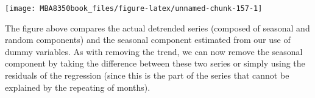 \documentclass[
]{book}
\newenvironment{Shaded}{\begin{snugshade}}{\end{snugshade}}
\newcommand{\AttributeTok}[1]{\textcolor[rgb]{0.77,0.63,0.00}{#1}}
\newcommand{\ConstantTok}[1]{\textcolor[rgb]{0.00,0.00,0.00}{#1}}
\newcommand{\DecValTok}[1]{\textcolor[rgb]{0.00,0.00,0.81}{#1}}
\newcommand{\FunctionTok}[1]{\textcolor[rgb]{0.00,0.00,0.00}{#1}}
\newcommand{\NormalTok}[1]{#1}
\newcommand{\OtherTok}[1]{\textcolor[rgb]{0.56,0.35,0.01}{#1}}
\newcommand{\SpecialCharTok}[1]{\textcolor[rgb]{0.00,0.00,0.00}{#1}}
\newcommand{\StringTok}[1]{\textcolor[rgb]{0.31,0.60,0.02}{#1}}
\begin{document}
\begin{Shaded}
\end{Shaded}

\begin{center}\texttt{[image: MBA8350book\_files/figure-latex/unnamed-chunk-157-1]} \end{center}

The figure above compares the actual detrended series (composed of seasonal and random components) and the seasonal component estimated from our use of dummy variables. As with removing the trend, we can now remove the seasonal component by taking the difference between these two series or simply using the residuals of the regression (since this is the part of the series that cannot be explained by the repeating of months).
\end{document}
